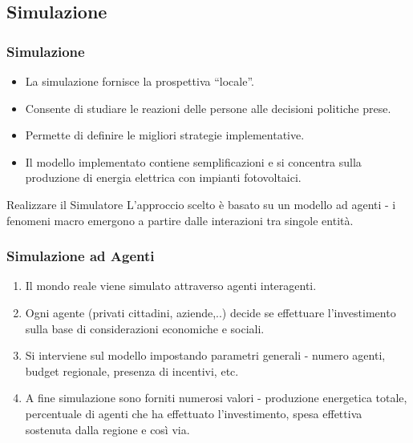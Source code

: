 \documentclass{beamer}
\begin{document}
\subsection{Simulazione}
	\begin{frame}
		\frametitle{Simulazione}
		\begin{block}{}
			\begin{itemize}
				\item La simulazione fornisce la prospettiva ``locale''.
				\item Consente di studiare le reazioni delle persone alle decisioni politiche prese.
				\item Permette di definire le migliori strategie implementative.
				\item Il modello implementato contiene semplificazioni e si concentra sulla produzione di energia elettrica con impianti fotovoltaici.
			\end{itemize}
		\end{block}
		\begin{alertblock}{Realizzare il Simulatore}
			L'approccio scelto è basato su un modello ad agenti - i fenomeni macro emergono a partire dalle interazioni tra singole entità.
		\end{alertblock}
  	\end{frame}
  	\begin{frame}
		\frametitle{Simulazione ad Agenti}
			\begin{enumerate}
				\item Il mondo reale viene simulato attraverso agenti interagenti.
				\item Ogni agente (privati cittadini, aziende,..) decide se effettuare l'investimento sulla base di considerazioni economiche e sociali.
				\item Si interviene sul modello impostando parametri generali - numero agenti, budget regionale, presenza di incentivi, etc.
				\item A fine simulazione sono forniti numerosi valori - produzione energetica totale, percentuale di agenti che ha effettuato l'investimento, spesa effettiva sostenuta dalla regione e così via.
			\end{enumerate}
  	\end{frame}
  	
\end{document}
